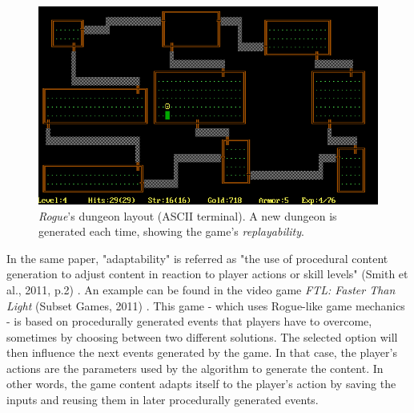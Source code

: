 \begin{figure}[!ht]
    \centering
    \includegraphics[scale=0.4]{Images/Rogue.png}
    \caption{\textit{Rogue}'s dungeon layout (ASCII terminal). A new dungeon is generated each time, showing the game's \textit{replayability}\cite{pic:rogue}.}
    \label{fig:Rogue}
\end{figure}

In the same paper, "adaptability" is referred as "the use of procedural content generation to adjust content in reaction to player actions or skill levels" (Smith et al., 2011, p.2) \cite{pdf:pcgbased}. An example can be found in the video game \textit{FTL: Faster Than Light} (Subset Games, 2011) \cite{game:ftl}. This game - which uses Rogue-like game mechanics - is based on procedurally generated events that players have to overcome, sometimes by choosing between two different solutions. The selected option will then influence the next events generated by the game. In that case, the player's actions are the parameters used by the algorithm to generate the content. In other words, the game content adapts itself to the player's action by saving the inputs and reusing them in later procedurally generated events.

